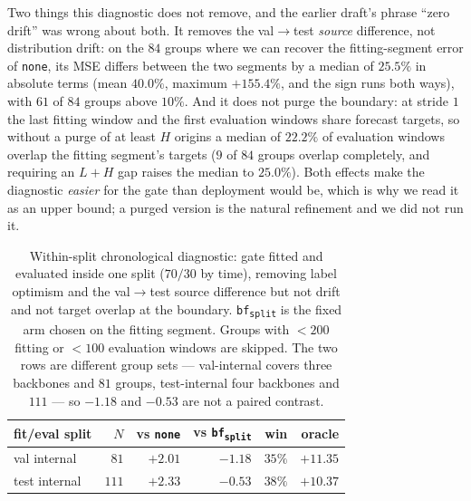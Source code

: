 \documentclass[a4paper,fleqn]{cas-sc}
\newcommand{\arm}[1]{\texttt{#1}}
\begin{document}
Two things this diagnostic does not remove, and the earlier draft's phrase ``zero
drift'' was wrong about both. It removes the val$\to$test \emph{source}
difference, not distribution drift: on the $84$ groups where we can recover the
fitting-segment error of \arm{none}, its MSE differs between the two segments by a
median of $25.5\%$ in absolute terms (mean $40.0\%$, maximum $+155.4\%$, and the
sign runs both ways), with $61$ of $84$ groups above $10\%$. And it does not purge
the boundary: at stride $1$ the last fitting window and the first evaluation
windows share forecast targets, so without a purge of at least $H$ origins a
median of $22.2\%$ of evaluation windows overlap the fitting segment's targets
($9$ of $84$ groups overlap completely, and requiring an $L+H$ gap raises the
median to $25.0\%$). Both effects make the diagnostic \emph{easier} for the gate
than deployment would be, which is why we read it as an upper bound; a purged
version is the natural refinement and we did not run it.

\begin{table}[t]
\centering\small
\caption{Within-split chronological diagnostic: gate fitted and evaluated inside
one split ($70/30$ by time), removing label optimism and the val$\to$test source
difference but not drift and not target overlap at the boundary.
\arm{bf\textsubscript{split}} is the fixed arm chosen on the fitting
segment. Groups with $<200$ fitting or $<100$ evaluation windows are skipped. The
two rows are different group sets --- val-internal covers three backbones and $81$
groups, test-internal four backbones and $111$ --- so $-1.18$ and $-0.53$ are not
a paired contrast.}
\label{tab:splitgate}
\begin{tabular}{lrrrrr}
\toprule
fit/eval split & $N$ & vs \arm{none} & vs \arm{bf\textsubscript{split}} & win & oracle \\
\midrule
val internal  & $81$  & $+2.01$ & $-1.18$ & $35\%$ & $+11.35$ \\
test internal & $111$ & $+2.33$ & $\mathbf{-0.53}$ & $38\%$ & $+10.37$ \\
\bottomrule
\end{tabular}
\end{table}
\end{document}
